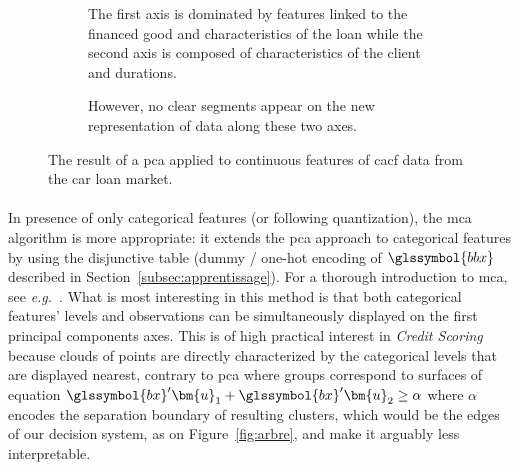 \begin{figure}[!htb]
{\setlength{\parindent}{0cm}}
\begin{multicols}{2}
\centering
\begin{subfigure}[t]{0.45\textwidth}
\centering
\resizebox{\textwidth}{!}{}
\caption{\label{fig:pca1} The first axis is dominated by features linked to the financed good and characteristics of the loan while the second axis is composed of characteristics of the client and durations.}
\end{subfigure}%
\columnbreak
\hspace*{1cm} \begin{subfigure}[t]{0.45\textwidth}
\centering
\resizebox{\textwidth}{!}{}
\caption{\label{fig:pca2} However, no clear segments appear on the new representation of data along these two axes.}
\end{subfigure}
\end{multicols}
\caption{\label{fig:pca} The result of a \gls{pca} applied to continuous features of \gls{cacf} data from the car loan market.}
\end{figure}

\paragraph{}

In presence of only categorical features (or following quantization), the \gls{mca} algorithm is more appropriate: it extends the \gls{pca} approach to categorical features by using the disjunctive table (dummy / one-hot encoding of $\glssymbol{bbx}$ described in Section~\ref{subsec:apprentissage}). For a thorough introduction to \gls{mca}, see \textit{e.g.}~\cite{lebart1995statistique}. What is most interesting in this method is that both categorical features' levels and observations can be simultaneously displayed on the first principal components axes.
This is of high practical interest in \textit{Credit Scoring} because clouds of points are directly characterized by the categorical levels that are displayed nearest, contrary to \gls{pca} where groups correspond to surfaces of equation $\glssymbol{bx} ' \bm{u}_1 + \glssymbol{bx} ' \bm{u}_2 \geq \alpha$ where $\alpha$ encodes the separation boundary of resulting clusters, which would be the edges of our decision system, as on Figure~\ref{fig:arbre}, and make it arguably less interpretable.

